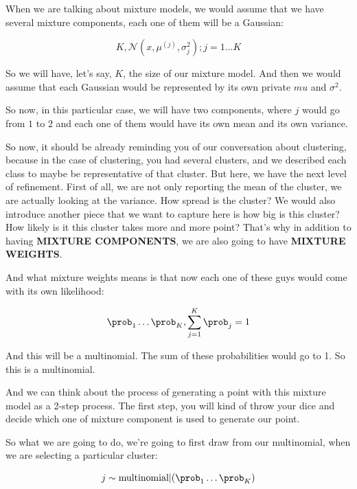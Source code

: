 \documentclass[a4paper, 12pt]{article}
\begin{document}
When we are talking about mixture models, we would assume that we have several
mixture components, each one of them will be a Gaussian:

\begin{equation}
\label{eq:org5ae6573}
K, \mathcal{N}(x, \mu^{(j)}, \sigma_{j}^{2}); j=1 \ldots K 
\end{equation}

So we will have, let's say, \(K\), the size of our mixture model. And then we
would assume that each Gaussian would be represented by its own private \(mu\)
and \(\sigma^2\).

So now, in this particular case, we will have two components, where \(j\) would
go from \(1\) to \(2\) and each one of them would have its own mean and its own
variance.

So now, it should be already reminding you of our conversation about clustering,
because in the case of clustering, you had several clusters, and we described
each class to maybe be representative of that cluster. But here, we have the
next level of refinement. First of all, we are not only reporting the mean of
the cluster, we are actually looking at the variance. How spread is the cluster?
We would also introduce another piece that we want to capture here is how big is
this cluster? How likely is it this cluster takes more and more point? That's
why in addition to having \textbf{MIXTURE COMPONENTS}, we are also going to have
\textbf{MIXTURE WEIGHTS}.

And what mixture weights means is that now each one of these guys would come
with its own likelihood:

\begin{equation}
\label{eq:org3bd0a80}
\prob_1 \ldots \prob_K, \sum_{j=1}^{K} \prob_j = 1
\end{equation}

And this will be a multinomial. The sum of these probabilities would go to 1. So
this is a multinomial.

And we can think about the process of generating a point with this mixture model
as a 2-step process. The first step, you will kind of throw your dice and decide
which one of mixture component is used to generate our point.

So what we are going to do, we're going to first draw from our multinomial, when
we are selecting a particular cluster:

\begin{equation}
\label{eq:org790389a}
j \sim \text{multinomial} | (\prob_1 \ldots \prob_K)
\end{equation}
\end{document}
